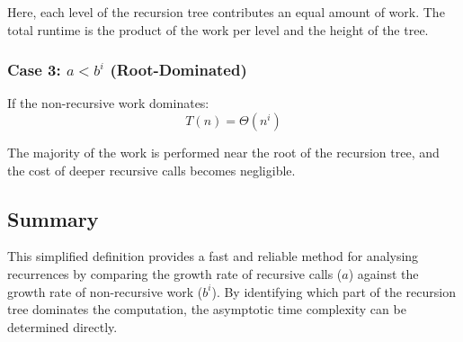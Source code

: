 \documentclass[12pt]{article}
\begin{document}
Here, each level of the recursion tree contributes an equal amount of work.
The total runtime is the product of the work per level and the height of the tree.

\vspace{0.15cm}

\subsubsection*{Case 3: $a < b^i$ (Root-Dominated)}

If the non-recursive work dominates:
\[
	T(n) = \Theta(n^i)
\]

The majority of the work is performed near the root of the recursion tree,
and the cost of deeper recursive calls becomes negligible.

\vspace{0.2cm}

\subsection*{Summary}

This simplified definition provides a fast and reliable method for analysing
recurrences by comparing the growth rate of recursive calls
($a$) against the growth rate of non-recursive work ($b^i$).
By identifying which part of the recursion tree dominates the computation,
the asymptotic time complexity can be determined directly.
\end{document}
